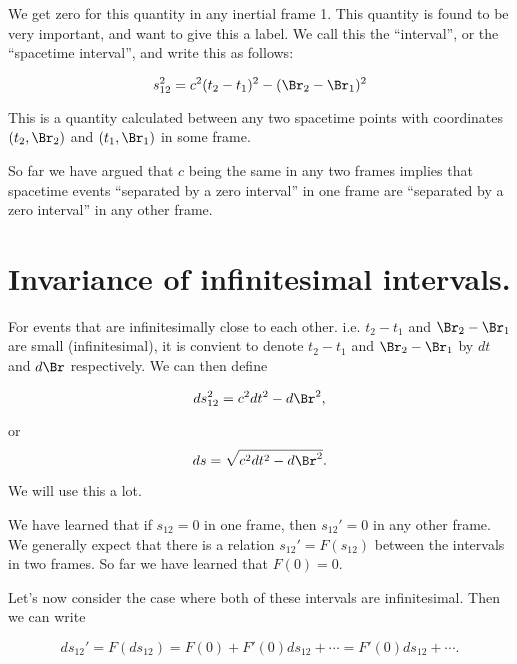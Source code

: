 We get zero for this quantity in any inertial frame 1.  This quantity is found to be very important, and want to give this a label.  We call this the ``interval'', or the ``spacetime interval'', and write this as follows:

\begin{equation}\label{eqn:relativisticElectrodynamicsL2:50}
s_{12}^2 = c^2 (t_2 - t_1)^2 - (\Br_2 - \Br_1)^2
\end{equation}

This is a quantity calculated between any two spacetime points with coordinates $(t_2, \Br_2)$ and $(t_1, \Br_1)$ in some frame.

So far we have argued that $c$ being the same in any two frames implies that spacetime events ``separated by a zero interval'' in one frame are ``separated by a zero interval'' in any other frame.

\section{Invariance of infinitesimal intervals.}

For events that are infinitesimally close to each other.  i.e. $t_2 - t_1$ and $\Br_2 -\Br_1$ are small (infinitesimal), it is convient to denote $t_2 - t_1$ and $\Br_2 - \Br_1$ by $dt$ and $d\Br$ respectively.  We can then define

\begin{equation}\label{eqn:relativisticElectrodynamicsL2:60}
ds_{12}^2 = c^2 dt^2 - d\Br^2,
\end{equation}

or
\begin{equation}\label{eqn:relativisticElectrodynamicsL2:60b}
ds= \sqrt{c^2 dt^2 - d\Br^2}.
\end{equation}

We will use this a lot.

We have learned that if $s_{12} = 0$ in one frame, then $s_{12}' = 0$ in any other frame.  We generally expect that there is a relation $s_{12}' = F(s_12)$ between the intervals in two frames.  So far we have learned that $F(0) = 0$. 

Let's now consider the case where both of these intervals are infinitesimal.  Then we can write

\begin{equation}\label{eqn:relativisticElectrodynamicsL2:70}
ds_{12}' = F(ds_{12}) = F(0) + F'(0) ds_{12} + \cdots = F'(0) ds_{12} + \cdots.
\end{equation}

